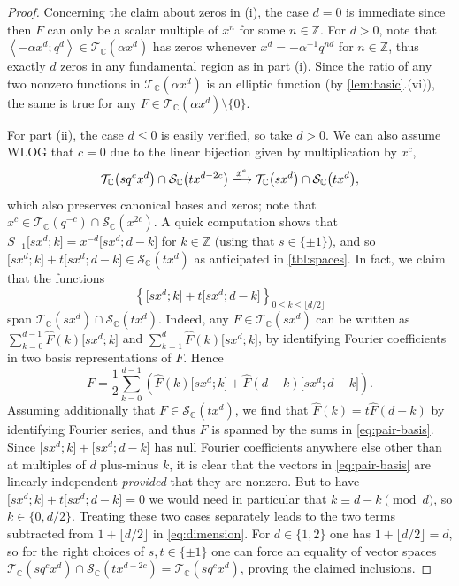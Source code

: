 \documentclass[reqno,11pt]{amsart}
\theoremstyle{definition}
\theoremstyle{remark}
\numberwithin{equation}{section}
\newcommand{\Z}{\mathbb{Z}}
\newcommand{\C}{\mathbb{C}}
\newcommand{\mT}{\mathcal{T}}
\newcommand{\mS}{\mathcal{S}}
\newcommand{\la}{\left\langle}
\newcommand{\ra}{\right\rangle}
\newcommand{\vect}[2]{\big[{#1};{#2}\big]}
\renewcommand{\hat}{\widehat}
\begin{document}
\begin{proof}
Concerning the claim about zeros in (i), the case $d = 0$ is immediate since then $F$ can only be a scalar multiple of $x^n$ for some $n \in \Z$. For $d > 0$, note that $\la -\alpha x^d; q^d \ra \in \mT_\C\left(\alpha x^d\right)$ has zeros whenever $x^d = -\alpha^{-1}q^{nd}$ for $n \in \Z$, thus exactly $d$ zeros in any fundamental region as in part (i). Since the ratio of any two nonzero functions in $\mT_\C\left(\alpha x^d\right)$ is an elliptic function (by \cref{lem:basic}.(vi)), the same is true for any $F \in \mT_\C\left(\alpha x^d\right) \setminus \{0\}$.

For part (ii), the case $d \le 0$ is easily verified, so take $d > 0$. We can also assume WLOG that $c = 0$ due to the linear bijection given by multiplication by $x^c$,
\[
     \mT_\C\big(sq^c x^d \big) \cap \mS_\C\big(tx^{d-2c}\big)
     \xlongrightarrow{x^c} 
     \mT_\C\big(s x^d \big) \cap \mS_\C\big(tx^{d}\big),
\]
which also preserves canonical bases and zeros; note that $x^c \in \mT_\C\left(q^{-c}\right) \cap \mS_\C\left(x^{2c}\right)$. A quick computation shows that $S_{-1}\vect{sx^d}{k} = x^{-d} \vect{sx^d}{d-k}$ for $k \in \Z$ (using that $s \in \{\pm 1\}$), and so $\vect{sx^d}{k} + t\vect{sx^d}{d-k} \in \mS_\C\left(tx^d\right)$ as anticipated in \cref{tbl:spaces}. In fact, we claim that the functions
\begin{equation} \label{eq:pair-basis}
    \left\{\vect{sx^d}{k} + t\vect{sx^d}{d-k}\right\}_{0 \le k \le \lfloor d/2 \rfloor}
\end{equation}
span $\mT_\C\left(sx^d\right) \cap \mS_\C\left(tx^d\right)$. Indeed, any $F \in \mT_\C\left(sx^d\right)$ can be written as $\sum_{k=0}^{d-1} \hat{F}(k) \vect{sx^d}{k}$ and $\sum_{k=1}^d \hat{F}(k) \vect{sx^d}{k}$, by identifying Fourier coefficients in two basis representations of $F$. Hence
\[
    F =
    \frac{1}{2} \sum_{k=0}^{d-1} \left(\hat{F}(k) \vect{sx^d}{k}  + \hat{F}(d-k) \vect{sx^d}{d-k} \right).
\]
Assuming additionally that $F \in \mS_\C\left(tx^d\right)$, we find that $\hat{F}(k) = t\hat{F}(d-k)$ by identifying Fourier series, and thus $F$ is spanned by the sums in \cref{eq:pair-basis}. Since $\vect{sx^d}{k} + \vect{sx^d}{d-k}$ has null Fourier coefficients anywhere else other than at multiples of $d$ plus-minus $k$, it is clear that the vectors in \cref{eq:pair-basis} are linearly independent \emph{provided} that they are nonzero. But to have $\vect{sx^d}{k} + t\vect{sx^d}{d-k} = 0$ we would need in particular that $k \equiv d-k \pmod{d}$, so $k \in \{0, d/2\}$. Treating these two cases separately leads to the two terms subtracted from $1 + \lfloor d/2 \rfloor$ in \cref{eq:dimension}. For $d \in \{1, 2\}$ one has $1 + \lfloor d/2 \rfloor = d$, so for the right choices of $s, t \in \{\pm 1\}$ one can force an equality of vector spaces $\mT_\C\left(sq^c x^d \right) \cap \mS_\C\left(tx^{d-2c} \right) = \mT_\C\left(sq^c x^d \right)$, proving the claimed inclusions.


\end{proof}
\end{document}
